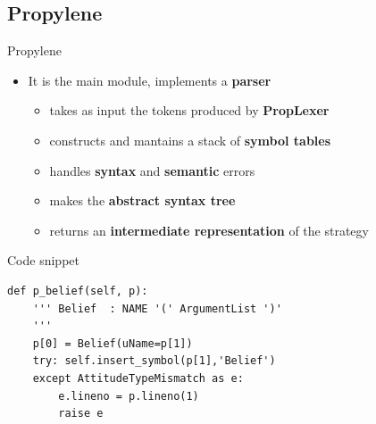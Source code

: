 \subsection{Propylene}
\begin{frame}[fragile]{Propylene}
  \begin{itemize}
  \item It is the main module, implements a {\bf parser}
    \begin{itemize}
    \item takes as input the tokens produced by {\bf PropLexer}
    \item constructs and mantains a stack of {\bf symbol tables}
    \item handles {\bf syntax} and {\bf semantic} errors
    \item makes the {\bf abstract syntax tree}
    \item returns an {\bf intermediate representation} of the strategy
    \end{itemize}
  \end{itemize}
  \begin{exampleblock}{Code snippet}
\begin{verbatim}
def p_belief(self, p):
    ''' Belief  : NAME '(' ArgumentList ')'
    '''
    p[0] = Belief(uName=p[1])
    try: self.insert_symbol(p[1],'Belief')
    except AttitudeTypeMismatch as e:
        e.lineno = p.lineno(1)
        raise e
\end{verbatim}
  \end{exampleblock}  
\end{frame}
